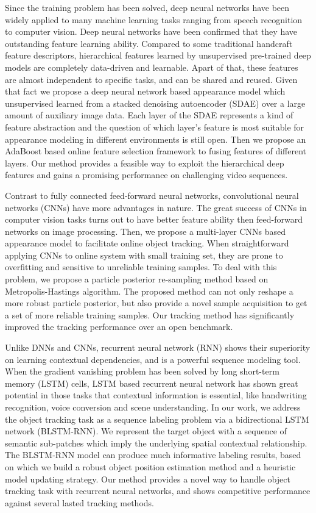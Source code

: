 {Since the training problem has been solved, deep neural networks have been widely applied to many machine learning tasks ranging from speech recognition to computer vision. Deep neural networks have been confirmed that they have outstanding feature learning ability. Compared to some traditional handcraft feature descriptors, hierarchical features learned by unsupervised pre-trained deep models are completely data-driven and learnable. Apart of that, these features are almost independent to specific tasks, and can be shared and reused. Given that fact we propose a deep neural network based appearance model which unsupervised learned from a stacked denoising autoencoder (SDAE) over a large amount of auxiliary image data. Each layer of the SDAE represents a kind of feature abstraction and the question of which layer's feature is most suitable for appearance modeling in different environments is still open. Then we propose an AdaBoost based online feature selection framework to fusing features of different layers. Our method provides a feasible way to exploit the hierarchical deep features and gains a promising performance on challenging video sequences.

Contrast to fully connected feed-forward neural networks, convolutional neural networks (CNNs) have more advantages in nature. The great success of CNNs in computer vision tasks turns out to have better feature ability then feed-forward networks on image processing. Then, we propose a multi-layer CNNs based appearance model to facilitate online object tracking. When straightforward applying CNNs to online system with small training set, they are prone to overfitting and sensitive to unreliable training samples. To deal with this problem, we propose a particle posterior re-sampling method based on Metropolis-Hastings algorithm. The proposed method can not only reshape a more robust particle posterior, but also provide a novel sample acquisition to get a set of more reliable training samples. Our tracking method has significantly improved the tracking performance over an open benchmark.

Unlike DNNs and CNNs, recurrent neural network (RNN) shows their superiority on learning contextual dependencies, and is a powerful sequence modeling tool. When the gradient vanishing problem has been solved by long short-term memory (LSTM) cells, LSTM based recurrent neural network has shown great potential in those tasks that contextual information is essential, like handwriting recognition, voice conversion and scene understanding. In our work, we address the object tracking task as a sequence labeling problem via a bidirectional LSTM network (BLSTM-RNN). We represent the target object with a sequence of semantic sub-patches which imply the underlying spatial contextual relationship. The BLSTM-RNN model can produce much informative labeling results, based on which we build a robust object position estimation method and a heuristic model updating strategy. Our method provides a novel way to handle object tracking task with recurrent neural networks, and shows competitive performance against several lasted tracking methods. 

}
